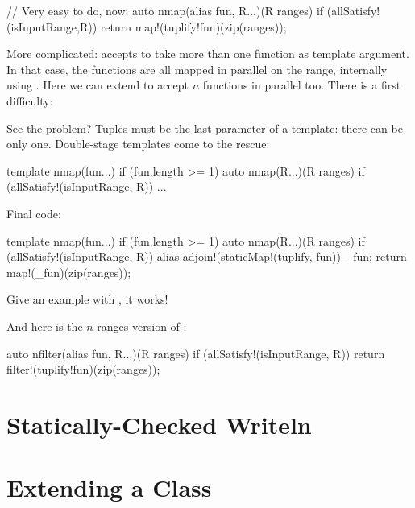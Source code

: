 \begin{dcode}
// Very easy to do, now:
auto nmap(alias fun, R...)(R ranges) if (allSatisfy!(isInputRange,R))
{
    return map!(tuplify!fun)(zip(ranges));
}
\end{dcode}

More complicated:  accepts to take more than one function as template argument. In that case, the functions are all mapped in parallel on the range, internally using .
Here we can extend  to accept $n$ functions in parallel too. There is a first difficulty:

\begin{dcode}
auto nmap(fun..., R...)(R ranges) if (allSatisfy!(isInputRange, R))
{ ... 
\end{dcode}

See the problem? Tuples must be the last parameter of a template: there can be only one. Double-stage templates come to the rescue:

\begin{dcode}
template nmap(fun...) if (fun.length >= 1)
{
    auto nmap(R...)(R ranges) if (allSatisfy!(isInputRange, R))
    {...}
}
\end{dcode}

Final code:

\begin{dcode}
template nmap(fun...) if (fun.length >= 1)
{
    auto nmap(R...)(R ranges) if (allSatisfy!(isInputRange, R))
    {
        alias adjoin!(staticMap!(tuplify, fun)) _fun;
        return map!(_fun)(zip(ranges));
    }
}
\end{dcode}

Give an example with , it works!

And here is the $n$-ranges version of :

\begin{dcode}
auto nfilter(alias fun, R...)(R ranges) if (allSatisfy!(isInputRange, R))
{
    return filter!(tuplify!fun)(zip(ranges));
}
\end{dcode}

\section{Statically-Checked Writeln}

\section{Extending a Class}\label{extendingaclass}

